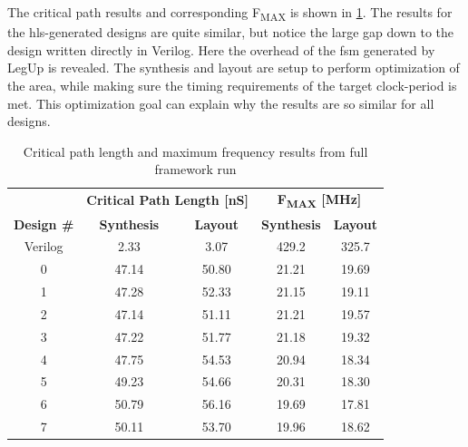 The critical path results and corresponding F\textsubscript{MAX} is shown in \cref{tab:critpathfmax}. The results for the \gls{hls}-generated designs are quite similar, but notice the large gap down to the design written directly in Verilog. Here the overhead of the \gls{fsm} generated by LegUp is revealed. The synthesis and layout are setup to perform optimization of the area, while making sure the timing requirements of the target clock-period is met. This optimization goal can explain why the results are so similar for all designs. 
\begin{table}[hbtp]
    \centering
    \begin{tabular}{c|cc|cc}
     \multicolumn{1}{c}{} & \multicolumn{2}{c}{\textbf{Critical Path Length [nS]}} & \multicolumn{2}{c}{\textbf{F\textsubscript{MAX} [MHz]}}\\
     \cline{2-5}
     \textbf{Design \#} & \textbf{Synthesis} & \textbf{Layout} & \textbf{Synthesis} & \textbf{Layout} \\
    \toprule
    Verilog & 2.33 & 3.07 & 429.2 & 325.7 \\
    0 & 47.14 & 50.80 & 21.21 & 19.69\\
    1 & 47.28 & 52.33 & 21.15 & 19.11\\
    2 & 47.14 & 51.11 & 21.21 & 19.57\\
    3 & 47.22 & 51.77 & 21.18 & 19.32\\
    4 & 47.75 & 54.53 & 20.94 & 18.34\\
    5 & 49.23 & 54.66 & 20.31 & 18.30\\
    6 & 50.79 & 56.16 & 19.69 & 17.81\\
    7 & 50.11 & 53.70 & 19.96 & 18.62\\
    \bottomrule
    \end{tabular}
    \caption{Critical path length and maximum frequency results from full framework run}
    \label{tab:critpathfmax}
\end{table}
       
